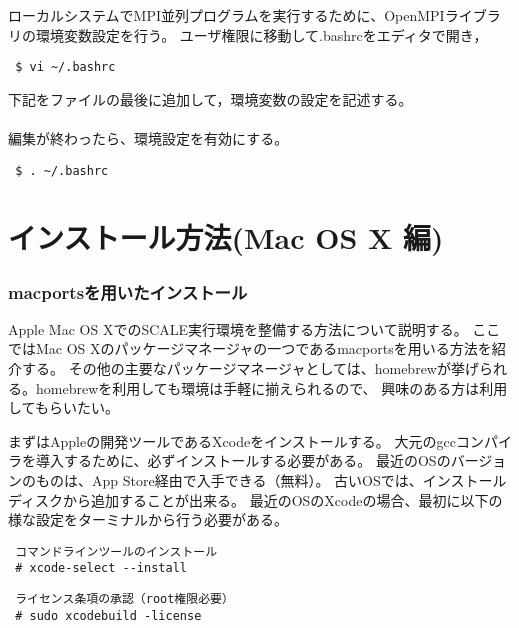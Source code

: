 ローカルシステムでMPI並列プログラムを実行するために、OpenMPIライブラリの環境変数設定を行う。
ユーザ権限に移動して.bashrcをエディタで開き，
\begin{verbatim}
 $ vi ~/.bashrc
\end{verbatim}
下記をファイルの最後に追加して，環境変数の設定を記述する。\\

\\

編集が終わったら、環境設定を有効にする。
\begin{verbatim}
 $ . ~/.bashrc
\end{verbatim}


\section{インストール方法(Mac OS X 編)} \label{chap:install_mac}

\subsubsection{macportsを用いたインストール}

Apple Mac OS XでのSCALE実行環境を整備する方法について説明する。
ここではMac OS Xのパッケージマネージャの一つであるmacportsを用いる方法を紹介する。
その他の主要なパッケージマネージャとしては、homebrewが挙げられる。homebrewを利用しても環境は手軽に揃えられるので、
興味のある方は利用してもらいたい。

まずはAppleの開発ツールであるXcodeをインストールする。
大元のgccコンパイラを導入するために、必ずインストールする必要がある。
最近のOSのバージョンのものは、App Store経由で入手できる（無料）。
古いOSでは、インストールディスクから追加することが出来る。
最近のOSのXcodeの場合、最初に以下の様な設定をターミナルから行う必要がある。
\begin{verbatim}
 コマンドラインツールのインストール
 # xcode-select --install
\end{verbatim}
\begin{verbatim}
 ライセンス条項の承認（root権限必要）
 # sudo xcodebuild -license
\end{verbatim}

